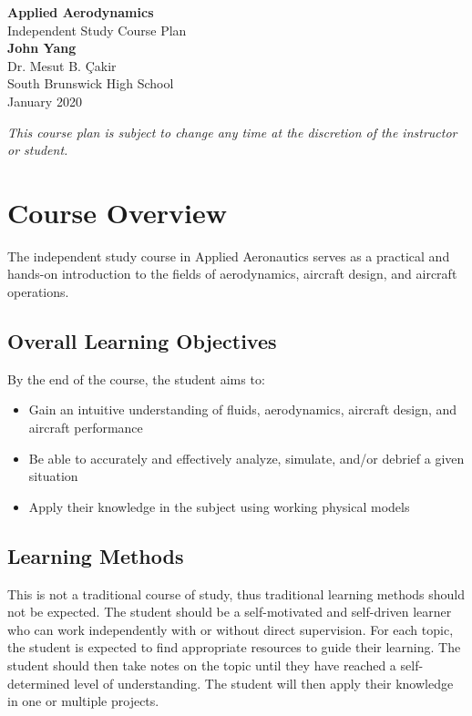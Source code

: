 \documentclass[12pt]{article}
\begin{document}
	\begin{titlepage}
		\begin{center}
			\vspace*{1cm}
			\Huge
				\textbf{Applied Aerodynamics}\\
			\vspace{0.5cm}
			\LARGE
				Independent Study Course Plan\\
			\vspace{1.5cm}
				\textbf{John Yang}\\
			\vfill
			\vspace{0.8cm}
			\Large
				Dr. Mesut B. \c{C}akir\\
				South Brunswick High School\\
				January 2020
		\end{center}
	\end{titlepage}

\tableofcontents\newpage

\textit{This course plan is subject to change any time at the discretion of the instructor or student.}

\section{Course Overview}
The independent study course in Applied Aeronautics serves as a practical and hands-on introduction to the fields of aerodynamics, aircraft design, and aircraft operations.
	\subsection{Overall Learning Objectives}
		By the end of the course, the student aims to: 
			\begin{itemize}
				\item Gain an intuitive understanding of fluids, aerodynamics, aircraft design, and aircraft performance
				\item Be able to accurately and effectively analyze, simulate, and/or debrief a given situation
				\item Apply their knowledge in the subject using working physical models
			\end{itemize}
	\subsection{Learning Methods}
		This is not a traditional course of study, thus traditional learning methods should not be expected. The student should be a self-motivated and self-driven learner who can work independently with or without direct supervision. For each topic, the student is expected to find appropriate resources to guide their learning. The student should then take notes on the topic until they have reached a self-determined level of understanding. The student will then apply their knowledge in one or multiple projects. 
\end{document}
